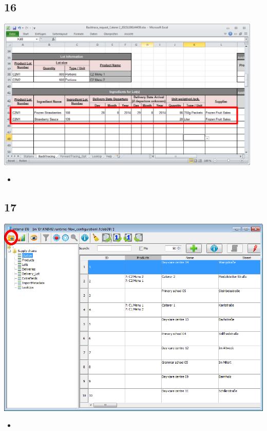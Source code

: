 \documentclass{beamer}
\begin{document}
\subsection{16}
\begin{frame}
	\begin{center}
  		\includegraphics[width=0.95\textwidth]{16.png}
	\end{center}
	\begin{itemize}
		\item
	\end{itemize}
\end{frame}

\subsection{17}
\begin{frame}
	\begin{center}
  		\includegraphics[height=0.6\textheight]{17.png}
	\end{center}
	\begin{itemize}
		\item
	\end{itemize}
\end{frame}
\end{document}
